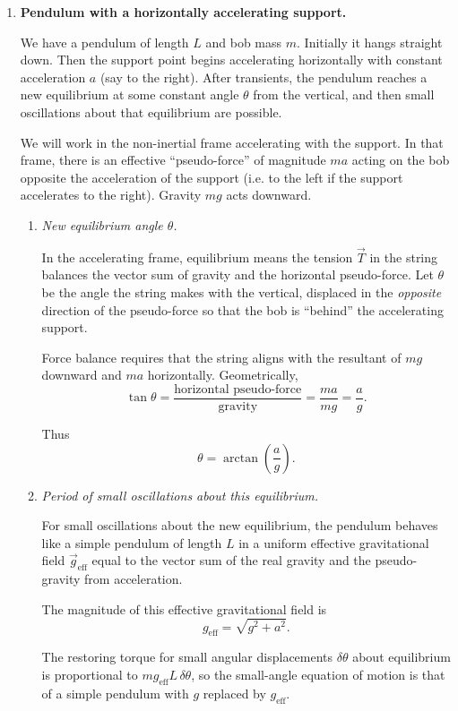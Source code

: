\documentclass[../main.tex]{subfiles}
\begin{document}
\begin{enumerate}
\item \textbf{Pendulum with a horizontally accelerating support.}

We have a pendulum of length $L$ and bob mass $m$. Initially it hangs straight down. Then the support point begins accelerating horizontally with constant acceleration $a$ (say to the right). After transients, the pendulum reaches a new equilibrium at some constant angle $\theta$ from the vertical, and then small oscillations about that equilibrium are possible.

We will work in the non-inertial frame accelerating with the support. In that frame, there is an effective ``pseudo-force'' of magnitude $ma$ acting on the bob opposite the acceleration of the support (i.e. to the left if the support accelerates to the right). Gravity $mg$ acts downward.

\begin{enumerate}
    \item \textit{New equilibrium angle $\theta$.}

    In the accelerating frame, equilibrium means the tension $\vec{T}$ in the string balances the vector sum of gravity and the horizontal pseudo-force. Let $\theta$ be the angle the string makes with the vertical, displaced in the \emph{opposite} direction of the pseudo-force so that the bob is ``behind'' the accelerating support.

    Force balance requires that the string aligns with the resultant of $mg$ downward and $ma$ horizontally. Geometrically,
    \[
    \tan \theta = \frac{\text{horizontal pseudo-force}}{\text{gravity}} = \frac{ma}{mg} = \frac{a}{g}.
    \]

    Thus
    \[
    \theta = \arctan\!\left(\frac{a}{g}\right).
    \]

    \item \textit{Period of small oscillations about this equilibrium.}

    For small oscillations about the new equilibrium, the pendulum behaves like a simple pendulum of length $L$ in a uniform effective gravitational field $\vec{g}_\text{eff}$ equal to the vector sum of the real gravity and the pseudo-gravity from acceleration.

    The magnitude of this effective gravitational field is
    \[
    g_\text{eff} = \sqrt{g^2 + a^2}.
    \]

    The restoring torque for small angular displacements $\delta\theta$ about equilibrium is proportional to $mg_\text{eff} L \, \delta\theta$, so the small-angle equation of motion is that of a simple pendulum with $g$ replaced by $g_\text{eff}$.


\end{enumerate}
\end{enumerate}
\end{document}
